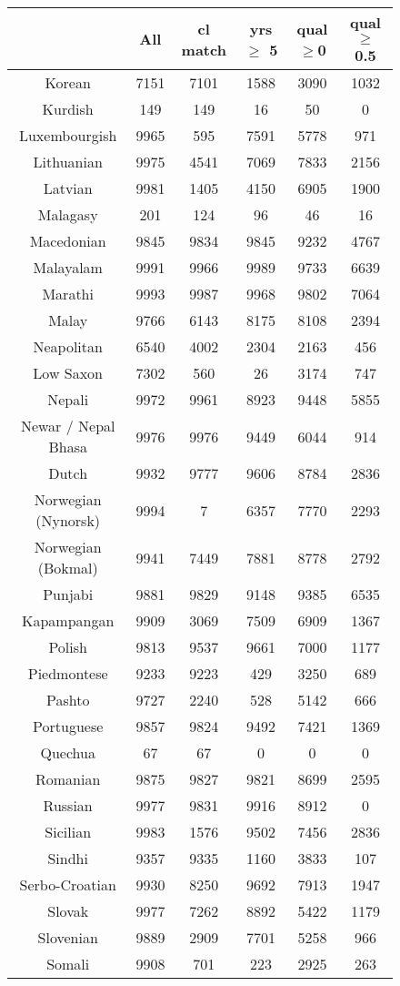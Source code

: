 \begin{figure}[h]
\centering
\begin{tabular}{cccccc}
&All&cl match&yrs $\geq$ 5&qual$\geq$0&qual$\geq$0.5\\
\hline\hline
Korean&7151&7101&1588&3090&1032\\
Kurdish&149&149&16&50&0\\
Luxembourgish&9965&595&7591&5778&971\\
Lithuanian&9975&4541&7069&7833&2156\\
Latvian&9981&1405&4150&6905&1900\\
Malagasy&201&124&96&46&16\\
Macedonian&9845&9834&9845&9232&4767\\
Malayalam&9991&9966&9989&9733&6639\\
Marathi&9993&9987&9968&9802&7064\\
Malay&9766&6143&8175&8108&2394\\
Neapolitan&6540&4002&2304&2163&456\\
Low Saxon&7302&560&26&3174&747\\
Nepali&9972&9961&8923&9448&5855\\
Newar / Nepal Bhasa&9976&9976&9449&6044&914\\
Dutch&9932&9777&9606&8784&2836\\
Norwegian (Nynorsk)&9994&7&6357&7770&2293\\
Norwegian (Bokmal)&9941&7449&7881&8778&2792\\
Punjabi&9881&9829&9148&9385&6535\\
Kapampangan&9909&3069&7509&6909&1367\\
Polish&9813&9537&9661&7000&1177\\
Piedmontese&9233&9223&429&3250&689\\
Pashto&9727&2240&528&5142&666\\
Portuguese&9857&9824&9492&7421&1369\\
Quechua&67&67&0&0&0\\
Romanian&9875&9827&9821&8699&2595\\
Russian&9977&9831&9916&8912&0\\
Sicilian&9983&1576&9502&7456&2836\\
Sindhi&9357&9335&1160&3833&107\\
Serbo-Croatian&9930&8250&9692&7913&1947\\
Slovak&9977&7262&8892&5422&1179\\
Slovenian&9889&2909&7701&5258&966\\
Somali&9908&701&223&2925&263\\

\end{tabular}
\end{figure}

